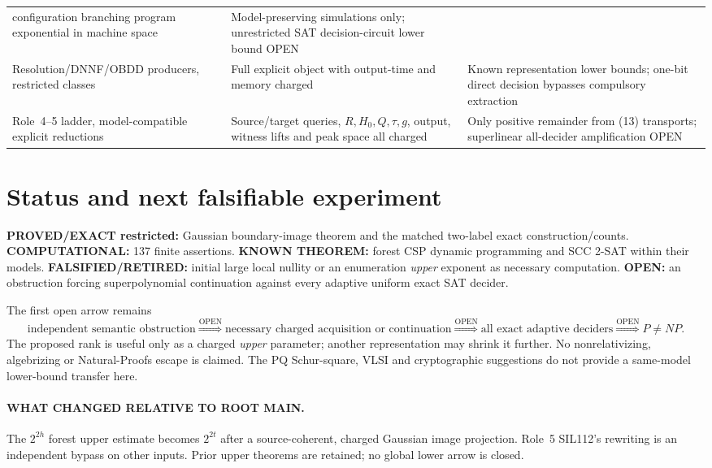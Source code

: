 \documentclass[11pt]{article}
\begin{document}
\begin{longtable}{p{.19\linewidth}p{.38\linewidth}p{.32\linewidth}}
configuration branching program exponential in machine space &
Model-preserving simulations only; unrestricted SAT
decision-circuit lower bound OPEN\\
Resolution/DNNF/OBDD producers, restricted classes &
Full explicit object with output-time and memory charged &
Known representation lower bounds; one-bit direct decision
bypasses compulsory extraction\\
Role~4--5 ladder, model-compatible explicit reductions &
Source/target queries, $R,H_0,Q,\tau,g$, output,
witness lifts and peak space all charged &
Only positive remainder from (13) transports;
superlinear all-decider amplification OPEN\\
\bottomrule
\end{longtable}\normalsize

\section{Status and next falsifiable experiment}
\textbf{PROVED/EXACT restricted:} Gaussian boundary-image theorem
and the matched two-label exact construction/counts.
\textbf{COMPUTATIONAL:} 137 finite assertions.
\textbf{KNOWN THEOREM:} forest CSP dynamic programming and
SCC 2-SAT within their models.
\textbf{FALSIFIED/RETIRED:} initial large local nullity or an
enumeration \emph{upper} exponent as necessary computation.
\textbf{OPEN:} an obstruction forcing superpolynomial
continuation against every adaptive uniform exact SAT decider.

The first open arrow remains
\[
\boxed{\text{independent semantic obstruction}}
\overset{\mathrm{OPEN}}{\Longrightarrow}
\boxed{\text{necessary charged acquisition or continuation}}
\overset{\mathrm{OPEN}}{\Longrightarrow}
\boxed{\text{all exact adaptive deciders}}
\overset{\mathrm{OPEN}}{\Longrightarrow}P\ne NP. \tag{14}
\]
The proposed rank is useful only as a charged \emph{upper}
parameter; another representation may shrink it further.
No nonrelativizing, algebrizing or Natural-Proofs escape is claimed.
The PQ Schur-square, VLSI and cryptographic suggestions do not
provide a same-model lower-bound transfer here.

\paragraph{WHAT CHANGED RELATIVE TO ROOT MAIN.}
The $2^{2h}$ forest upper estimate becomes $2^{2t}$ after
a source-coherent, charged Gaussian image projection. Role~5
SIL112's rewriting is an independent bypass on other inputs.
Prior upper theorems are retained; no global lower arrow is closed.
\end{document}
